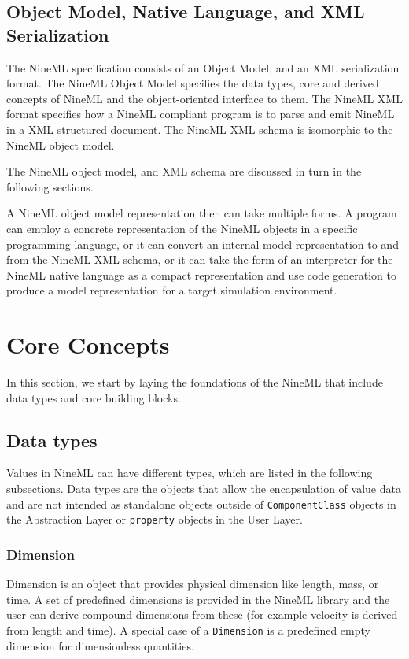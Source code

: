 \documentclass{article}
\begin{document}
\subsection{Object Model, Native Language, and XML Serialization}

The NineML specification consists of an Object Model, and an XML serialization
format. The NineML Object Model specifies the data types, core and derived
concepts of NineML and the object-oriented interface to them. The NineML
XML format specifies how a NineML compliant program is to parse and emit
NineML in a XML structured document.  The NineML XML schema is
isomorphic to the NineML object model.

The NineML object model, and XML schema are discussed in turn in the
following sections.

A NineML object model representation then can take multiple forms.  A
program can employ a concrete representation of the NineML objects in
a specific programming language, or it can convert an internal model
representation to and from the NineML XML schema, or it can take the
form of an interpreter for the NineML native language as a compact
representation and use code generation to produce a model
representation for a target simulation environment.

\section{Core Concepts}

In this section, we start by laying the foundations of the NineML
that include data types and core building blocks.

\subsection{Data types}
\label{DataTypes}

Values in NineML can have different types, which are listed in the
following subsections. Data types are the objects that allow the
encapsulation of value data and are not intended as standalone
objects outside of {\tt ComponentClass} objects in the Abstraction
Layer or {\tt property} objects in the User Layer.

\subsubsection{Dimension}

Dimension is an object that provides physical dimension like length,
mass, or time. A set of predefined dimensions is provided in the
NineML library and the user can derive compound dimensions from these
(for example velocity is derived from length and time). A special case
of a {\tt Dimension} is a predefined empty dimension for dimensionless
quantities.
\end{document}
